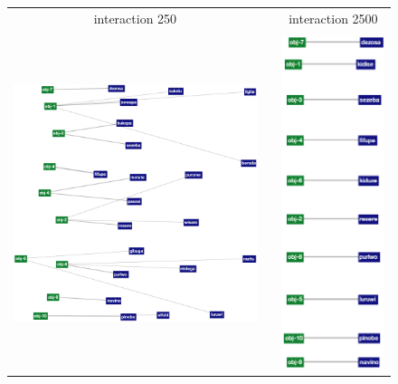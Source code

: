 \begin{figure}[t]
  \begin{tabular}{cp{1cm}c}
    interaction 250 & & interaction 2500 \\
    & & \\
    \includegraphics[scale=0.4]{figures/ng-lexicon-250} & &
    \includegraphics[scale=0.4]{figures/ng-lexicon-2500} \\

\end{tabular}
\end{figure}
